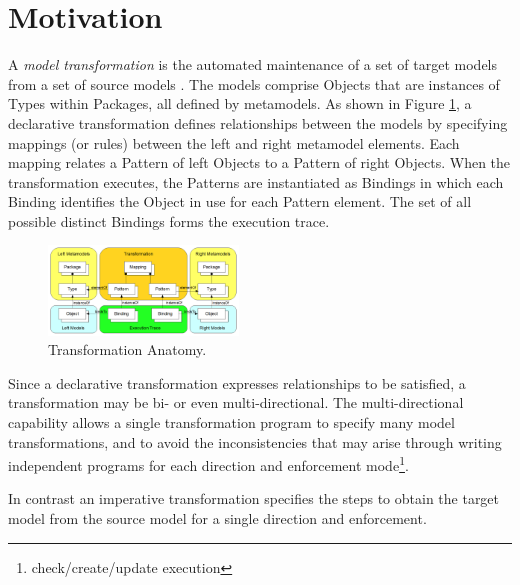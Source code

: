 %
\section{Motivation}\label{sec:motivation}

A \textit{model transformation} is the automated maintenance of a set of target models from a set of source models \cite{Kleppe.etal2003}. The models comprise Objects that are instances of Types within Packages, all defined by metamodels. As shown in Figure \ref{fig:TransformationAnatomy}, a declarative transformation defines relationships between the models by specifying mappings (or rules) between the left and right metamodel elements. Each mapping relates a Pattern of left Objects to a Pattern of right Objects. When the transformation executes, the Patterns are instantiated as Bindings in which each Binding identifies the Object in use for each Pattern element. The set of all possible distinct Bindings forms the execution trace.

\begin{figure}[h]
	\centering
	\includegraphics[width=0.45\textwidth]{TransformationAnatomy.png}
	\caption{Transformation Anatomy.}
	\label{fig:TransformationAnatomy}
\end{figure}

Since a declarative transformation expresses relationships to be satisfied, a transformation may be bi- or even multi-directional. The multi-directional capability allows a single transformation program to specify many model transformations, and to avoid the inconsistencies that may arise through writing independent programs for each direction and enforcement mode\footnote{check/create/update execution}.

In contrast an imperative transformation specifies the steps to obtain the target model from the source model for a single direction and enforcement\cite{Mens.Gorp2006}.

